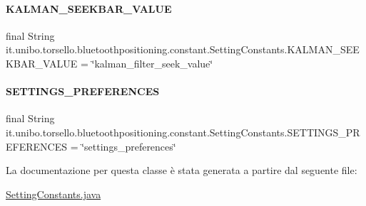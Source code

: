 \paragraph{\texorpdfstring{K\+A\+L\+M\+A\+N\+\_\+\+S\+E\+E\+K\+B\+A\+R\+\_\+\+V\+A\+L\+UE}{KALMAN\_SEEKBAR\_VALUE}}
{\footnotesize\ttfamily final String it.\+unibo.\+torsello.\+bluetoothpositioning.\+constant.\+Setting\+Constants.\+K\+A\+L\+M\+A\+N\+\_\+\+S\+E\+E\+K\+B\+A\+R\+\_\+\+V\+A\+L\+UE = \char`\"{}kalman\+\_\+filter\+\_\+seek\+\_\+value\char`\"{}\hspace{0.3cm}{\ttfamily [static]}}

\hypertarget{classit_1_1unibo_1_1torsello_1_1bluetoothpositioning_1_1constant_1_1SettingConstants_ae1b406c787a7efb87d585d5c8b80493d_ae1b406c787a7efb87d585d5c8b80493d}{}\label{classit_1_1unibo_1_1torsello_1_1bluetoothpositioning_1_1constant_1_1SettingConstants_ae1b406c787a7efb87d585d5c8b80493d_ae1b406c787a7efb87d585d5c8b80493d} 
\paragraph{\texorpdfstring{S\+E\+T\+T\+I\+N\+G\+S\+\_\+\+P\+R\+E\+F\+E\+R\+E\+N\+C\+ES}{SETTINGS\_PREFERENCES}}
{\footnotesize\ttfamily final String it.\+unibo.\+torsello.\+bluetoothpositioning.\+constant.\+Setting\+Constants.\+S\+E\+T\+T\+I\+N\+G\+S\+\_\+\+P\+R\+E\+F\+E\+R\+E\+N\+C\+ES = \char`\"{}settings\+\_\+preferences\char`\"{}\hspace{0.3cm}{\ttfamily [static]}}



La documentazione per questa classe è stata generata a partire dal seguente file\+:\begin{DoxyCompactItemize}
\item 
\hyperlink{SettingConstants_8java}{Setting\+Constants.\+java}\end{DoxyCompactItemize}
